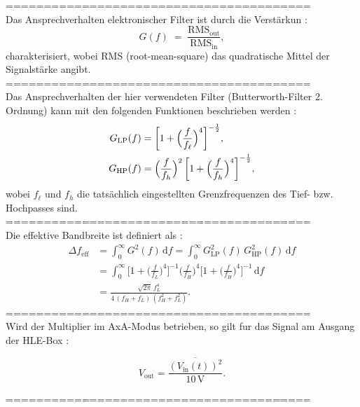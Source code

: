 ========================================\\
Das Ansprechverhalten elektronischer Filter ist durch die Verstärkun \cite{praktikum}:
\begin{equation}
  G(f) \;=\; \frac{\mathrm{RMS}_{\mathrm{out}}}{\mathrm{RMS}_{\mathrm{in}}},
\end{equation}
charakterisiert, wobei RMS (root-mean-square) das quadratische Mittel der Signalstärke angibt.
========================================\\
Das Ansprechverhalten der hier verwendeten Filter (Butterworth-Filter 2. Ordnung) kann mit den folgenden Funktionen beschrieben werden \cite{praktikum}:
\begin{align}
  G_{\mathrm{LP}}(f) &= \biggl[1 + \Bigl(\frac{f}{f_\ell}\Bigr)^4\biggr]^{-\frac{1}{2}}, \\
  G_{\mathrm{HP}}(f) &= \Bigl(\frac{f}{f_h}\Bigr)^2 \,\biggl[1 + \Bigl(\frac{f}{f_h}\Bigr)^4\biggr]^{-\frac{1}{2}},
\end{align}
wobei $f_\ell$ und $f_h$ die tatsächlich eingestellten Grenzfrequenzen des Tief- bzw. Hochpasses sind.
========================================\\

Die effektive Bandbreite ist definiert als \cite{praktikum}:
\begin{equation}
\begin{aligned}
\Delta f_{\mathrm{eff}}
  &= \int_{0}^{\infty} G^2(f)\,\mathrm{d}f
   = \int_{0}^{\infty} G_{\mathrm{LP}}^2(f)\,G_{\mathrm{HP}}^2(f)\,\mathrm{d}f \\[6pt]
  &= \int_{0}^{\infty}
    \bigl[1 + \bigl(\tfrac{f}{f_L}\bigr)^4\bigr]^{-1}
    \bigl(\tfrac{f}{f_H}\bigr)^4
    \bigl[1 + \bigl(\tfrac{f}{f_H}\bigr)^4\bigr]^{-1}
    \,\mathrm{d}f \\[6pt]
  &= \frac{\sqrt{2\pi}\,f_L^4}{4\,(f_H + f_L)\,(f_H^2 + f_L^2)}.
\end{aligned}
\end{equation}
========================================\\
Wird der Multiplier im AxA-Modus betrieben, so gilt fur das Signal am Ausgang der HLE-Box \cite{praktikum}:

\begin{equation}
  V_{\mathrm{out}} = \frac{\overline{(V_{\mathrm{in}}(t))^2}}{10\,\mathrm{V}}.
\end{equation}

========================================\\

